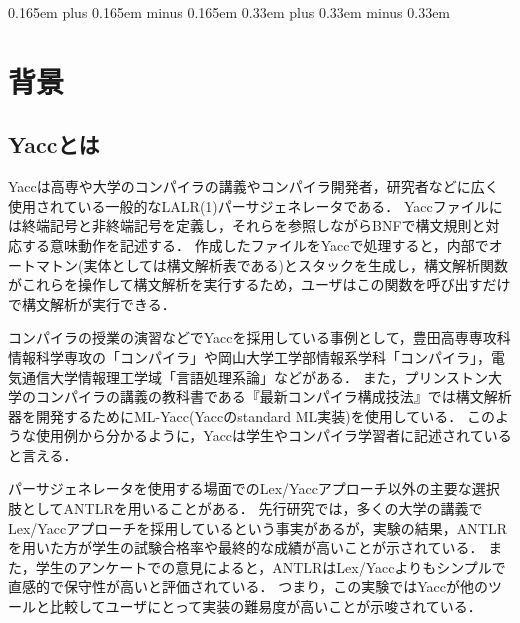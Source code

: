 \documentclass[fontsize=9bp,twocolumn,column_gap=2.36zw,a4paper,report]{jlreq}
\begin{document}
\thispagestyle{header}

\ltjsetkanjiskip 0.165em plus 0.165em minus 0.165em
\ltjsetxkanjiskip 0.33em plus 0.33em minus 0.33em

\chapter{背景}
\section{Yaccとは}\label{sec:yacc}

Yaccは高専や大学のコンパイラの講義やコンパイラ開発者，研究者などに広く使用されている一般的なLALR(1)パーサジェネレータである．
Yaccファイルには終端記号と非終端記号を定義し，それらを参照しながらBNFで構文規則と対応する意味動作を記述する．
作成したファイルをYaccで処理すると，内部でオートマトン(実体としては構文解析表である)とスタックを生成し，構文解析関数がこれらを操作して構文解析を実行するため，ユーザはこの関数を呼び出すだけで構文解析が実行できる．\par
コンパイラの授業の演習などでYaccを採用している事例として，豊田高専専攻科情報科学専攻の「コンパイラ」\cite{nittc_syllabus}や岡山大学工学部情報系学科「コンパイラ」\cite{okayama_syllabus}，電気通信大学情報理工学域「言語処理系論」\cite{uec_syllabus}などがある．
また，プリンストン大学のコンパイラの講義の教科書である『最新コンパイラ構成技法』\cite{tiger_book}では構文解析器を開発するためにML-Yacc(Yaccのstandard ML実装)を使用している．
このような使用例から分かるように，Yaccは学生やコンパイラ学習者に記述されていると言える．\par
パーサジェネレータを使用する場面でのLex/Yaccアプローチ以外の主要な選択肢としてANTLRを用いることがある．
先行研究では，多くの大学の講義でLex/Yaccアプローチを採用しているという事実があるが，実験の結果，ANTLRを用いた方が学生の試験合格率や最終的な成績が高いことが示されている\cite{ortin2022empirical}．
また，学生のアンケートでの意見によると，ANTLRはLex/Yaccよりもシンプルで直感的で保守性が高いと評価されている．
つまり，この実験ではYaccが他のツールと比較してユーザにとって実装の難易度が高いことが示唆されている．
\end{document}
